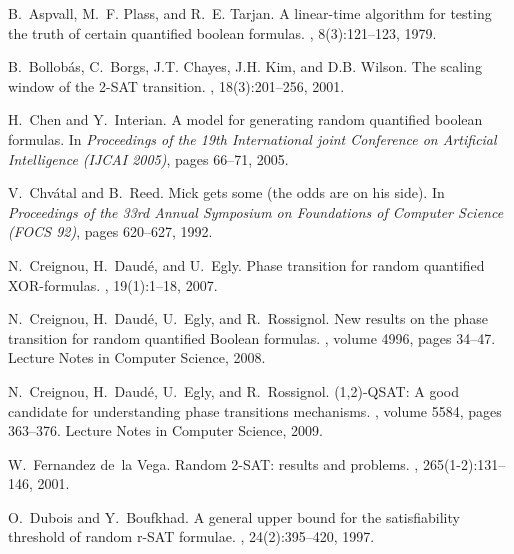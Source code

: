 \documentclass[aop,noinfoline]{imsart}
\begin{document}
\fi



\begin{thebibliography}{10}

B.~Aspvall, M.~F. Plass, and R.~E. Tarjan.
\newblock A linear-time algorithm for testing the truth of certain quantified
  boolean formulas.
, 8(3):121--123, 1979.

B.~Bollob{\'a}s, C.~Borgs, J.T. Chayes, J.H. Kim, and D.B. Wilson.
\newblock The scaling window of the 2-{SAT} transition.
, 18(3):201--256, 2001.

H.~Chen and Y.~Interian.
\newblock A model for generating random quantified boolean formulas.
\newblock In {\em Proceedings of the 19th International joint Conference on
  Artificial Intelligence (IJCAI 2005)}, pages 66--71, 2005.

V.~Chv\'atal and B.~Reed.
\newblock Mick gets some (the odds are on his side).
\newblock In {\em Proceedings of the 33rd Annual Symposium on Foundations of
  Computer Science (FOCS 92)}, pages 620--627, 1992.

N.~Creignou, H.~Daud\'e, and U.~Egly.
\newblock Phase transition for random quantified {XOR}-formulas.
, 19(1):1--18, 2007.

N.~Creignou, H.~Daud\'e, U.~Egly, and R.~Rossignol.
\newblock New results on the phase transition for random quantified {B}oolean
  formulas.
, volume 4996, pages 34--47. Lecture Notes in Computer Science,
  2008.

N.~Creignou, H.~Daud\'e, U.~Egly, and R.~Rossignol.
\newblock (1,2)-{QSAT}: A good candidate for understanding phase transitions
  mechanisms.
, volume 5584, pages 363--376. Lecture Notes in Computer Science,
  2009.

W.~Fernandez de~la Vega.
\newblock Random 2-{SAT}: results and problems.
, 265(1-2):131--146, 2001.

O.~Dubois and Y.~Boufkhad.
\newblock A general upper bound for the satisfiability threshold of random
  r-{SAT} formulae.
, 24(2):395--420, 1997.


\end{thebibliography}
\end{document}
